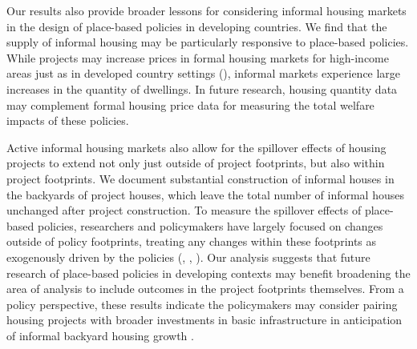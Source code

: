 \documentclass[12pt]{article}
\begin{document}

Our results also provide broader lessons for considering informal housing markets in the design of place-based policies in developing countries.  We find that the supply of informal housing may be particularly responsive to place-based policies.  While projects may increase prices in formal housing markets for high-income areas just as in developed country settings (\cite{diamond2019wants}), informal markets experience large increases in the quantity of dwellings.  In future research, housing quantity data may complement formal housing price data for measuring the total welfare impacts of these policies.  

Active informal housing markets also allow for the spillover effects of housing projects to extend not only just outside of project footprints, but also within project footprints.  We document substantial construction of informal houses in the backyards of project houses, which leave the total number of informal houses unchanged after project construction.  To measure the spillover effects of place-based policies, researchers and policymakers have largely focused on changes outside of policy footprints, treating any changes within these footprints as exogenously driven by the policies (\cite{diamond2019wants}, \cite{rossi2010housing}, \cite{hornbeck2017creative}).  Our analysis suggests that future research of place-based policies in developing contexts may benefit broadening the area of analysis to include outcomes in the project footprints themselves.  From a policy perspective, these results indicate the policymakers may consider pairing housing projects with broader investments in basic infrastructure in anticipation of informal backyard housing growth \citep{visagie2020getting}.
\end{document}
